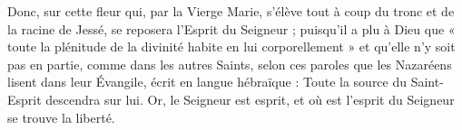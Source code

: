 Donc, sur cette fleur qui, par la Vierge Marie, s’élève tout à coup du tronc et de la racine de Jessé, se reposera l’Esprit du Seigneur ; puisqu’il a plu à Dieu que « toute la plénitude de la divinité habite en lui corporellement » et qu’elle n’y soit pas en partie, comme dans les autres Saints, selon ces paroles que les Nazaréens lisent dans leur Évangile, écrit en langue hébraïque : Toute la source du Saint-Esprit descendra sur lui. Or, le Seigneur est esprit, et où est l’esprit du Seigneur se trouve la liberté.
